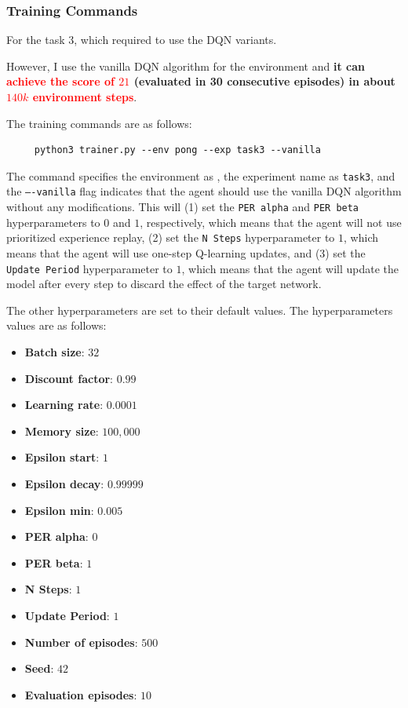 \subsubsection{Training Commands}

For the task 3, which required to use the DQN variants.

However, I use the vanilla DQN algorithm for the \pong environment and \textbf{it can \textcolor{red}{achieve the score of $21$} (evaluated in 30 consecutive episodes) in about \textcolor{red}{$140k$ environment steps}}.

The training commands are as follows:

\begin{verbatim}
     python3 trainer.py --env pong --exp task3 --vanilla
\end{verbatim}

The command specifies the environment as \pong, the experiment name as \texttt{task3}, and the \texttt{----vanilla} flag indicates that the agent should use the vanilla DQN algorithm without any modifications. This will (1) set the \texttt{PER alpha} and \texttt{PER beta} hyperparameters to $0$ and $1$, respectively, which means that the agent will not use prioritized experience replay, (2) set the \texttt{N Steps} hyperparameter to $1$, which means that the agent will use one-step Q-learning updates, and (3) set the \texttt{Update Period} hyperparameter to $1$, which means that the agent will update the model after every step to discard the effect of the target network.

The other hyperparameters are set to their default values.
The hyperparameters values are as follows:
\begin{itemize}
    \item \textbf{Batch size}: $32$
    \item \textbf{Discount factor}: $0.99$
    \item \textbf{Learning rate}: $0.0001$
    \item \textbf{Memory size}: $100,000$
    \item \textbf{Epsilon start}: $1$
    \item \textbf{Epsilon decay}: $0.99999$
    \item \textbf{Epsilon min}: $0.005$
    \item \textbf{PER alpha}: $0$
    \item \textbf{PER beta}: $1$
    \item \textbf{N Steps}: $1$
    \item \textbf{Update Period}: $1$
    \item \textbf{Number of episodes}: $500$
    \item \textbf{Seed}: $42$
    \item \textbf{Evaluation episodes}: $10$
\end{itemize}

